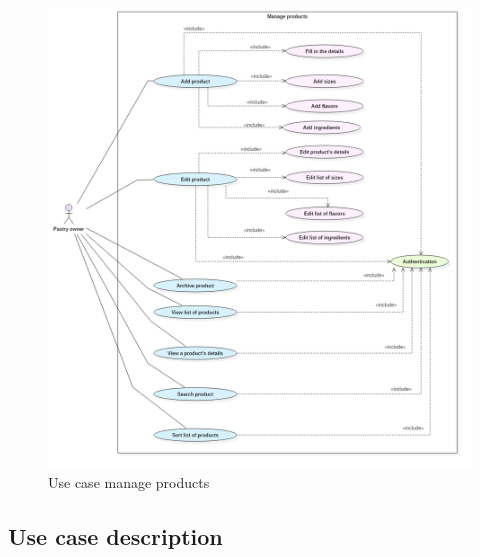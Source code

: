 \documentclass[12pt,a4paper]{report}
\begin{document}
\begin{figure}[H]
	\vspace*{2cm}
	\centering
	\includegraphics[width=7.2in,keepaspectratio]{ManageProducts.png}
	\caption{Use case manage products}
	\label{edit-product}
\end{figure}
\subsection{Use case description}
\end{document}
